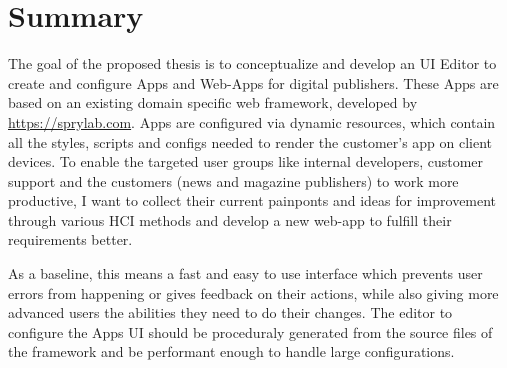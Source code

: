 \section*{Summary}
The goal of the proposed thesis is to conceptualize and develop an UI Editor to create and configure Apps and Web-Apps for digital publishers. These Apps are based on an existing domain specific web framework, developed by \url{https://sprylab.com}. Apps are configured via dynamic resources, which contain all the styles, scripts and configs needed to render the customer's app on client devices.
To enable the targeted user groups like internal developers,
customer support and the customers (news and magazine publishers) to work more productive,
I want to collect their current painponts and ideas for improvement through various HCI methods and develop a new web-app to fulfill their requirements better.

As a baseline, this means a fast and easy to use interface which prevents user errors from happening or gives feedback on their actions, while also giving more advanced users the abilities they need to do their changes. The editor to configure the Apps UI should be proceduraly generated from the source files of the framework and be performant enough to handle large configurations.

